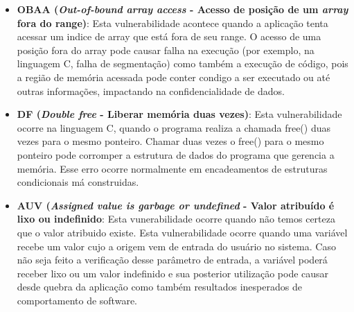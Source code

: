 \begin{itemize}
\item \textbf{OBAA (\emph{Out-of-bound array access } - Acesso de posição de um \emph{array} fora do range)}:
%
Esta vulnerabilidade acontece quando a aplicação tenta acessar um indice de array que está fora de seu range. O acesso de uma posição fora do array pode causar falha na execução (por exemplo, na linguagem C, falha de segmentação) como também a execução de código, pois a região de memória acessada pode conter condigo a ser executado ou até outras informações, impactando na confidencialidade de dados.

\item \textbf{DF (\emph{Double free } - Liberar memória duas vezes)}:
%
Esta vulnerabilidade ocorre na linguagem C, quando o programa realiza a chamada free() duas vezes para o mesmo ponteiro. Chamar duas vezes o free() para o mesmo ponteiro pode corromper a estrutura de dados do programa que gerencia a memória. Esse erro ocorre normalmente em encadeamentos de estruturas condicionais má construidas.

\item \textbf{AUV (\emph{Assigned value is garbage or undefined} - Valor atribuído é lixo ou indefinido}:
%
Esta vunerabilidade ocorre quando não temos certeza que o valor atribuido existe. Esta vulnerabilidade ocorre quando uma variável recebe um valor cujo a origem vem de entrada do usuário no sistema. Caso não seja feito a verificação desse parâmetro de entrada, a variável poderá receber lixo ou um valor indefinido e sua posterior utilização pode causar desde quebra da aplicação como também resultados inesperados de comportamento de software.

\end{itemize}

%


